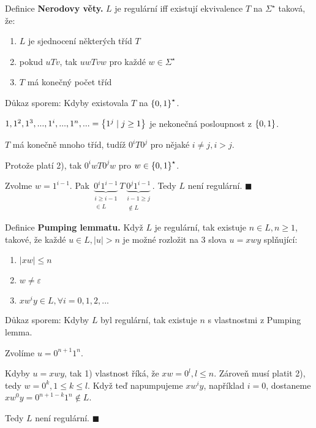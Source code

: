 Definice \textbf{Nerodovy věty.} $L$ je regulární iff existují ekvivalence $T$ na $\Sigma^\star$ taková, že:
\begin{enumerate}[1), noitemsep]
    \item $L$ je sjednocení některých tříd $T$
    \item pokud $uTv$, tak $uwTvw$ pro každé $w \in \Sigma^\star$
    \item $T$ má konečný počet tříd
\end{enumerate}
Důkaz sporem:
Kdyby existovala $T$ na $\left\lbrace 0,1 \right\rbrace^\star$.

$1, 1^2, 1^3, ..., 1^i, ..., 1^n, ... = \left\lbrace 1^j \mid j \geq 1 \right\rbrace$ je nekonečná posloupnost z $\left\lbrace 0,1 \right\rbrace$.

$T$ má konečně mnoho tříd, tudíž $0^i T 0^j$ pro nějaké $i \not= j, i>j$.

Protože platí 2), tak $0^i w T 0^j w$ pro $w \in \left\lbrace 0,1 \right\rbrace^\star$.

Zvolme $w = 1^{i-1}$. Pak $\underbrace{0^i 1^{i-1}}_{\substack{i \geq i-1 \\ \in L}} T
\underbrace{0^j 1^{i-1}}_{\substack{i-1 \geq j  \\\not\in L }}$. Tedy $L$ není regulární. $\blacksquare$

Definice \textbf{Pumping lemmatu.} Když $L$ je regulární, tak existuje $n \in L, n \geq 1$, takové, že každé ${u \in L},
|u| > n$ je
možné rozložit na 3 slova $u = xwy$ splňující:
\begin{enumerate}[1), noitemsep]
    \item $|xw| \leq n$
    \item $w \not= \varepsilon$
    \item $xw^i y \in L, \forall i = 0, 1, 2, ...$
\end{enumerate}
Důkaz sporem:
Kdyby $L$ byl regulární, tak existuje $n$ s vlastnostmi z Pumping lemma.

Zvolíme $u = 0^{n+1} 1^n$.

Kdyby $u = xwy$, tak 1) vlastnost říká, že $xw = 0^l, l \leq n$. Zároveň musí platit 2), tedy $w = 0^k, 1 \leq k \leq l$.
Když teď napumpujeme $xw^i y$, například $i=0$, dostaneme $xw^0 y = 0^{n+1-k} 1^{n} \not\in L$.

Tedy $L$ není regulární. $\blacksquare$

